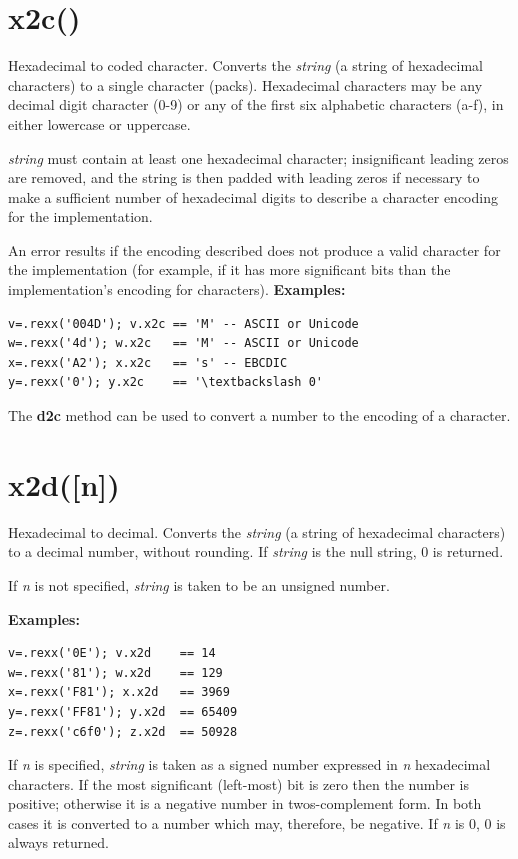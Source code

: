 \section{x2c()}\label{refx2c}
Hexadecimal to coded character.
Converts the \emph{string} (a string of hexadecimal characters) to
a single character (packs).
Hexadecimal characters may be any decimal digit character (0-9) or any
of the first six alphabetic characters (a-f), in either lowercase or
uppercase.
 
\emph{string} must contain at least one hexadecimal character;
insignificant leading zeros are removed, and the string is then padded
with leading zeros if necessary to make a sufficient number of
hexadecimal digits to describe a character encoding for the
implementation.
 
An error results if the encoding described does not produce a valid
character for the implementation (for example, if it has more
significant bits than the implementation's encoding for characters).
 \textbf{Examples:}
\begin{lstlisting}
v=.rexx('004D'); v.x2c == 'M' -- ASCII or Unicode
w=.rexx('4d'); w.x2c   == 'M' -- ASCII or Unicode
x=.rexx('A2'); x.x2c   == 's' -- EBCDIC
y=.rexx('0'); y.x2c    == '\textbackslash 0'
\end{lstlisting}
 The  \textbf{d2c} method %
 can be used to
convert a \crexx{} number to the encoding of a character.

\section{x2d([n{]})}\label{refx2d}
Hexadecimal to decimal.
Converts the \emph{string} (a string of hexadecimal characters) to
a decimal number, without rounding.
If \emph{string} is the null string, 0 is returned.
 
If \emph{n} is not specified, \emph{string} is taken to
be an unsigned number.
 
\textbf{Examples:}
\begin{lstlisting}
v=.rexx('0E'); v.x2d    == 14
w=.rexx('81'); w.x2d    == 129
x=.rexx('F81'); x.x2d   == 3969
y=.rexx('FF81'); y.x2d  == 65409
z=.rexx('c6f0'); z.x2d  == 50928
\end{lstlisting}
 
If \emph{n} is specified, \emph{string} is taken as a signed
number expressed in \emph{n} hexadecimal characters.
If the most significant (left-most) bit is zero then the number is
positive; otherwise it is a negative number in twos-complement form.
In both cases it is converted to a \crexx{} number which may,
therefore, be negative.
If \emph{n} is 0, 0 is always returned.
 
